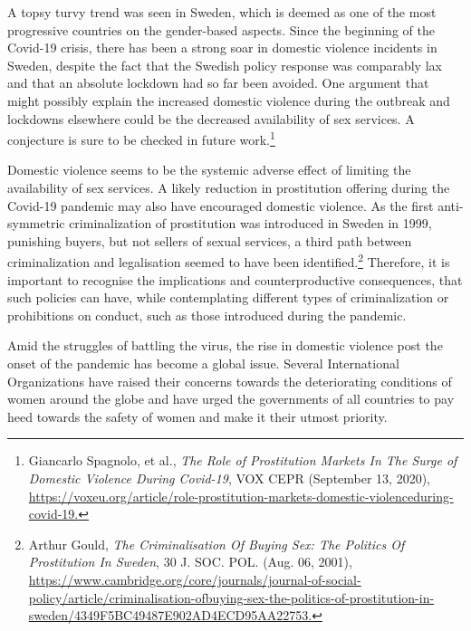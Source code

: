 \begin{multicols}{2}
\noi
A topsy turvy trend was seen in Sweden, which is deemed as one of the most progressive
countries on the gender-based aspects. Since the beginning of the Covid-19 crisis, there has
been a strong soar in domestic violence incidents in Sweden, despite the fact that the Swedish
policy response was comparably lax and that an absolute lockdown had so far been avoided.
One argument that might possibly explain the increased domestic violence during the outbreak and lockdowns elsewhere could be the decreased availability of sex services. A
conjecture is sure to be checked in future work.\footnote{Giancarlo Spagnolo, et al., \textit{The Role of Prostitution Markets In The Surge of Domestic Violence During Covid-19}, VOX CEPR (September 13, 2020), \url{https://voxeu.org/article/role-prostitution-markets-domestic-violenceduring-covid-19.}}

\noi
Domestic violence seems to be the systemic adverse effect of limiting the availability of sex
services. A likely reduction in prostitution offering during the Covid-19 pandemic may also
have encouraged domestic violence. As the first anti-symmetric criminalization of
prostitution was introduced in Sweden in 1999, punishing buyers, but not sellers of sexual
services, a third path between criminalization and legalisation seemed to have been
identified.\footnote{Arthur Gould, \textit{The Criminalisation Of Buying Sex: The Politics Of Prostitution In Sweden}, 30 J. SOC. POL.
(Aug. 06, 2001), \url{https://www.cambridge.org/core/journals/journal-of-social-policy/article/criminalisation-ofbuying-sex-the-politics-of-prostitution-in-sweden/4349F5BC49487E902AD4ECD95AA22753.}} Therefore, it is important to recognise the implications and counterproductive
consequences, that such policies can have, while contemplating different types of
criminalization or prohibitions on conduct, such as those introduced during the pandemic.


\noi
Amid the struggles of battling the virus, the rise in domestic violence post the onset of the
pandemic has become a global issue. Several International Organizations have raised their
concerns towards the deteriorating conditions of women around the globe and have urged the
governments of all countries to pay heed towards the safety of women and make it their
utmost priority.



\end{multicols}
